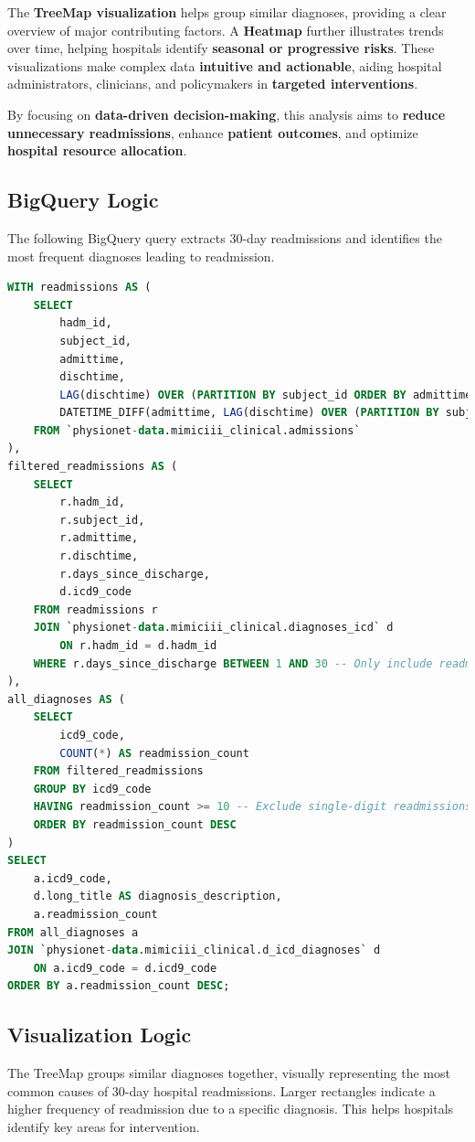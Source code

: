 \documentclass[a4paper,10pt]{article}
\begin{document}
The \textbf{TreeMap visualization} helps group similar diagnoses, providing a clear overview of major contributing factors. A \textbf{Heatmap} further illustrates trends over time, helping hospitals identify \textbf{seasonal or progressive risks}. These visualizations make complex data \textbf{intuitive and actionable}, aiding hospital administrators, clinicians, and policymakers in \textbf{targeted interventions}.

By focusing on \textbf{data-driven decision-making}, this analysis aims to \textbf{reduce unnecessary readmissions}, enhance \textbf{patient outcomes}, and optimize \textbf{hospital resource allocation}.

\subsection{BigQuery Logic}
The following BigQuery query extracts 30-day readmissions and identifies the most frequent diagnoses leading to readmission.

\begin{lstlisting}[language=SQL]
WITH readmissions AS (
    SELECT 
        hadm_id,
        subject_id,
        admittime,
        dischtime,
        LAG(dischtime) OVER (PARTITION BY subject_id ORDER BY admittime) AS prev_discharge,
        DATETIME_DIFF(admittime, LAG(dischtime) OVER (PARTITION BY subject_id ORDER BY admittime), DAY) AS days_since_discharge
    FROM `physionet-data.mimiciii_clinical.admissions`
),
filtered_readmissions AS (
    SELECT 
        r.hadm_id,
        r.subject_id,
        r.admittime,
        r.dischtime,
        r.days_since_discharge,
        d.icd9_code
    FROM readmissions r
    JOIN `physionet-data.mimiciii_clinical.diagnoses_icd` d 
        ON r.hadm_id = d.hadm_id
    WHERE r.days_since_discharge BETWEEN 1 AND 30 -- Only include readmissions within 30 days
),
all_diagnoses AS (
    SELECT 
        icd9_code,
        COUNT(*) AS readmission_count
    FROM filtered_readmissions
    GROUP BY icd9_code
    HAVING readmission_count >= 10 -- Exclude single-digit readmissions
    ORDER BY readmission_count DESC
)
SELECT 
    a.icd9_code,
    d.long_title AS diagnosis_description,
    a.readmission_count
FROM all_diagnoses a
JOIN `physionet-data.mimiciii_clinical.d_icd_diagnoses` d 
    ON a.icd9_code = d.icd9_code
ORDER BY a.readmission_count DESC;
\end{lstlisting}

\subsection{Visualization Logic}
The TreeMap groups similar diagnoses together, visually representing the most common causes of 30-day hospital readmissions. Larger rectangles indicate a higher frequency of readmission due to a specific diagnosis. This helps hospitals identify key areas for intervention.
\end{document}
